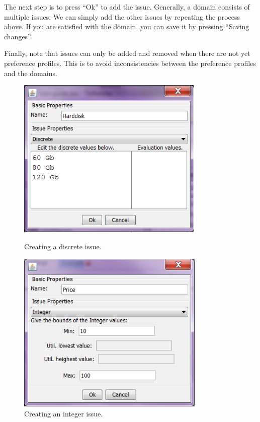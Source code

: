 \documentclass[]{article}
\begin{document}
The next step is to press ``Ok'' to add the issue. Generally, a domain consists of multiple issues. We can simply add the other issues by repeating the process above. If you are satisfied with the domain, you can save it by pressing  ``Saving changes''.

Finally, note that issues can only be added and removed when there are not yet preference profiles. This is to avoid inconsistencies between the preference profiles and the domains.

\begin{figure}[ht]
\begin{minipage}[b]{0.45\linewidth}
\centering
	\includegraphics[width=0.8\textwidth]{media/image7a.png}
\caption{Creating a discrete issue.}
\label{fig:createIssueD}
\end{minipage}
\begin{minipage}[b]{0.45\linewidth}
\centering
	\includegraphics[width=0.8\textwidth]{media/image7b.png}
\caption{Creating an integer issue.}\label{fig:createIssueI}
\end{minipage}
\end{figure}
\end{document}
